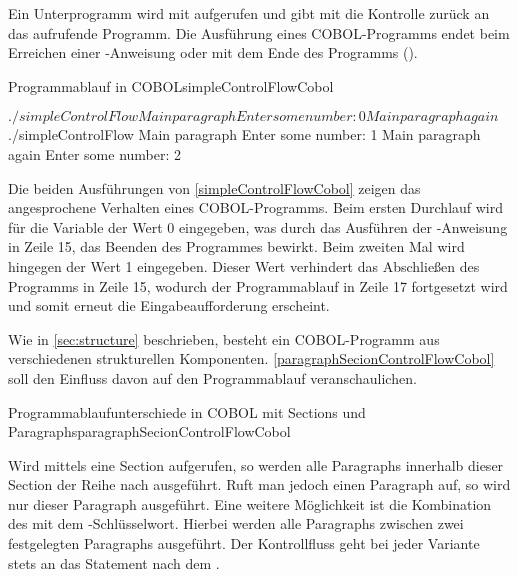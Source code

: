 Ein Unterprogramm wird mit  aufgerufen und gibt mit  die Kontrolle zurück an das aufrufende Programm. Die Ausführung eines COBOL-Programms endet beim Erreichen einer -Anweisung oder mit dem Ende des Programms (). 

\begin{codeWithCaption}{Programmablauf in COBOL}{simpleControlFlowCobol}
\begin{shellwindow}
$ ./simpleControlFlow 
Main paragraph
Enter some number: 0
Main paragraph again
$ ./simpleControlFlow 
Main paragraph
Enter some number: 1 
Main paragraph again
Enter some number: 2
\end{shellwindow}
\end{codeWithCaption}

Die beiden Ausführungen von \autoref{simpleControlFlowCobol} zeigen das angesprochene Verhalten eines COBOL-Programms. Beim ersten Durchlauf wird für die Variable  der Wert 0 eingegeben, was durch das Ausführen der -Anweisung in Zeile 15, das Beenden des Programmes bewirkt. Beim zweiten Mal wird hingegen der Wert 1 eingegeben. Dieser Wert verhindert das Abschließen des Programms in Zeile 15, wodurch der Programmablauf in Zeile 17 fortgesetzt wird und somit erneut die Eingabeaufforderung erscheint.

Wie in \autoref{sec:structure} beschrieben, besteht ein COBOL-Programm aus verschiedenen strukturellen Komponenten. \autoref{paragraphSecionControlFlowCobol} soll den Einfluss davon auf den Pro\-grammab\-lauf veranschaulichen.

\begin{codeWithCaption}{Programmablaufunterschiede in COBOL mit Sections und Paragraphs}{paragraphSecionControlFlowCobol}
\end{codeWithCaption}

Wird mittels  eine Section aufgerufen, so werden alle Paragraphs innerhalb dieser Section der Reihe nach ausgeführt. Ruft man jedoch einen Paragraph auf, so wird nur dieser Paragraph ausgeführt. Eine weitere Möglichkeit ist die Kombination des  mit dem -Schlüsselwort. Hierbei werden alle Paragraphs zwischen zwei festgelegten Paragraphs ausgeführt. Der Kontrollfluss geht bei jeder Variante stets an das Statement nach dem .


